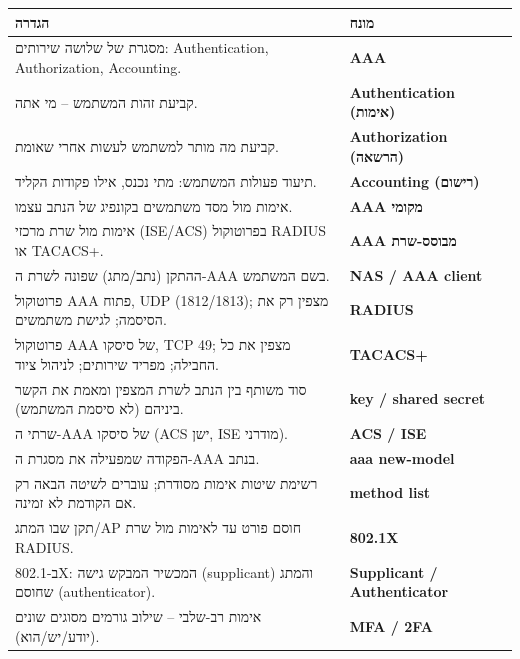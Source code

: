 \documentclass[11pt]{article}
\newcommand{\enLR}[1]{\textenglish{#1}}
\begin{document}
\begin{xltabular}{\linewidth}{|>{\setRTL\raggedleft\arraybackslash}X|>{\setRTL\raggedleft\arraybackslash}X|}
\hline
{}\textbf{הגדרה} & \textbf{מונח} \\
\hline
\endhead
מסגרת של שלושה שירותים: \enLR{Authentication, Authorization, Accounting.} & \textbf{\enLR{AAA}} \\
\hline
קביעת זהות המשתמש – מי אתה. & \textbf{\enLR{Authentication} (אימות)} \\
\hline
קביעת מה מותר למשתמש לעשות אחרי שאומת. & \textbf{\enLR{Authorization} (הרשאה)} \\
\hline
תיעוד פעולות המשתמש: מתי נכנס, אילו פקודות הקליד. & \textbf{\enLR{Accounting} (רישום)} \\
\hline
אימות מול מסד משתמשים בקונפיג של הנתב עצמו. & \textbf{\enLR{AAA} מקומי} \\
\hline
אימות מול שרת מרכזי \enLR{(ISE/ACS)} בפרוטוקול \enLR{RADIUS} או \enLR{TACACS+.} & \textbf{\enLR{AAA} מבוסס-שרת} \\
\hline
ההתקן (נתב/מתג) שפונה לשרת ה-\enLR{AAA} בשם המשתמש. & \textbf{\enLR{NAS / AAA client}} \\
\hline
פרוטוקול \enLR{AAA} פתוח, \enLR{UDP (1812/1813)}; מצפין רק את הסיסמה; לגישת משתמשים. & \textbf{\enLR{RADIUS}} \\
\hline
פרוטוקול \enLR{AAA} של סיסקו, \enLR{TCP 49}; מצפין את כל החבילה; מפריד שירותים; לניהול ציוד. & \textbf{\enLR{TACACS}+} \\
\hline
סוד משותף בין הנתב לשרת המצפין ומאמת את הקשר ביניהם (לא סיסמת המשתמש). & \textbf{\enLR{key / shared secret}} \\
\hline
שרתי ה-\enLR{AAA} של סיסקו \enLR{(ACS} ישן, \enLR{ISE} מודרני). & \textbf{\enLR{ACS / ISE}} \\
\hline
הפקודה שמפעילה את מסגרת ה-\enLR{AAA} בנתב. & \textbf{\enLR{aaa new-model}} \\
\hline
רשימת שיטות אימות מסודרת; עוברים לשיטה הבאה רק אם הקודמת לא זמינה. & \textbf{\enLR{method list}} \\
\hline
תקן שבו המתג/\enLR{AP} חוסם פורט עד לאימות מול שרת \enLR{RADIUS.} & \textbf{\enLR{802.1X}} \\
\hline
ב-\enLR{802.1X}: המכשיר המבקש גישה \enLR{(supplicant)} והמתג שחוסם \enLR{(authenticator).} & \textbf{\enLR{Supplicant / Authenticator}} \\
\hline
אימות רב-שלבי – שילוב גורמים מסוגים שונים (יודע/יש/הוא). & \textbf{\enLR{MFA / 2FA}} \\
\hline
\end{xltabular}
\end{document}
